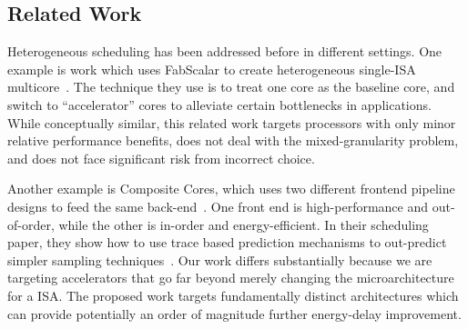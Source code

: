 \subsection{Related Work} Heterogeneous scheduling has been addressed before in
different settings.  One example is work which uses FabScalar to create
heterogeneous single-ISA multicore~\cite{Navada:2013:UVN:2523721.2523743}.
The technique they use is to treat one core as the baseline core, and switch
to ``accelerator'' cores to alleviate certain bottlenecks in applications.
While conceptually similar, this related work targets processors with only minor
relative performance benefits, does not deal with the mixed-granularity
problem, and does not face significant risk from incorrect choice.

Another example is Composite Cores, which uses two different frontend
pipeline designs to feed
the same back-end~\cite{Lukefahr:2012:CCP:2457472.2457508}.  One front end is
high-performance and out-of-order, while the other is in-order and
energy-efficient.  In their scheduling paper, they show how to use trace
based prediction mechanisms to out-predict simpler sampling
techniques~\cite{conf/micro/PadmanabhaLDM13}.  Our work differs substantially
because we are targeting accelerators that go far beyond merely
changing the microarchitecture for a ISA.  The proposed work targets
fundamentally distinct architectures which can provide
potentially an order of magnitude further energy-delay improvement.


